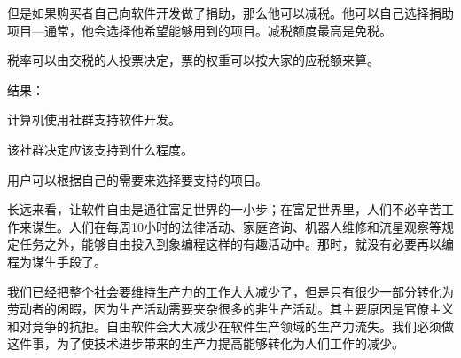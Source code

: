 但是如果购买者自己向软件开发做了捐助，那么他可以减税。他可以自己选择捐助项目—通常，他会选择他希望能够用到的项目。减税额度最高是免税。\par
税率可以由交税的人投票决定，票的权重可以按大家的应税额来算。\par
\textsf{结果：}\par
计算机使用社群支持软件开发。\par
该社群决定应该支持到什么程度。\par
用户可以根据自己的需要来选择要支持的项目。\par
长远来看，让软件自由是通往富足世界的一小步；在富足世界里，人们不必辛苦工作来谋生。人们在每周10小时的法律活动、家庭咨询、机器人维修和流星观察等规定任务之外，能够自由投入到象编程这样的有趣活动中。那时，就没有必要再以编程为谋生手段了。\par
我们已经把整个社会要维持生产力的工作大大减少了，但是只有很少一部分转化为劳动者的闲暇，因为生产活动需要夹杂很多的非生产活动。其主要原因是官僚主义和对竞争的抗拒。自由软件会大大减少在软件生产领域的生产力流失。我们必须做这件事，为了使技术进步带来的生产力提高能够转化为人们工作的减少。
